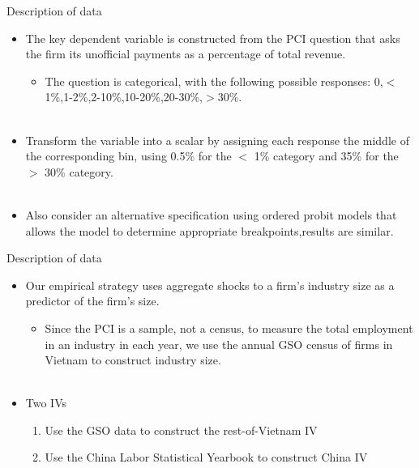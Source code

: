 \documentclass{beamer}
\begin{document}
\begin{frame}{Description of data}

\begin{itemize}
\item The key dependent variable is constructed from the PCI question that asks the firm its unofficial payments as a percentage of total revenue.
\begin{itemize}
\item The question is categorical, with the following possible responses: 0,$<$1\%,1-2\%,2-10\%,10-20\%,20-30\%,$>$30\%. \\~
\end{itemize}

\item Transform the variable into a scalar by assigning each response the middle of the corresponding bin, using 0.5\% for the $<$ 1\% category and 35\% for the $>$ 30\% category.\\~

\item Also consider an alternative specification using ordered probit models that allows the model to determine appropriate breakpoints,results are similar.

\end{itemize}

\end{frame}

\begin{frame}{Description of data}

\begin{itemize}
\item Our empirical strategy uses aggregate shocks to a firm's industry size as a predictor of the firm's size.
\begin{itemize}
\item Since the PCI is a sample, not a census, to measure the total employment in an industry in each year, we use the annual GSO census of firms in Vietnam to construct industry size.\\~
\end{itemize}

\item Two IVs
\begin{enumerate}
\item Use the GSO data to construct the rest-of-Vietnam IV
\item Use the China Labor Statistical Yearbook to construct China IV
\end{enumerate}

\end{itemize}

\end{frame}
\end{document}

